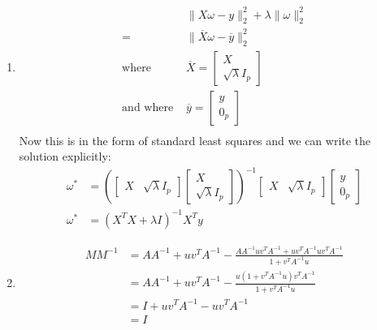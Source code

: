 \documentclass[11pt]{article}
\begin{document}
\begin{solution}
  \begin{enumerate}
    \item \begin{align*}
      &\|X \omega - y \|_2^2 + \lambda \|\omega\|_2^2 \\
      =& \|\overline{X} \omega - \overline{y}\|_2^2 \\
      \text{where } & \overline{X} = \begin{bmatrix} X \\ \sqrt{\lambda} I_p \end{bmatrix} \\
      \text{and where } & \overline{y} = \begin{bmatrix} y \\ 0_p \end{bmatrix} \\
    \end{align*}
    Now this is in the form of standard least squares and we can write the solution explicitly:
    \begin{align*}
      \omega^* &= (\begin{bmatrix} X & \sqrt{\lambda} I_p\end{bmatrix} \begin{bmatrix}X \\ \sqrt{\lambda} I_p \end{bmatrix})^{-1} \begin{bmatrix} X & \sqrt{\lambda} I_p \end{bmatrix} \begin{bmatrix} y \\ 0_p \end{bmatrix} \\
      \omega^* &= (X^T X + \lambda I)^{-1} X^T y
    \end{align*}

    \item \begin{align*}
        M M^{-1} &= A A^{-1} + u v^T A^{-1} - \frac{AA^{-1}uv^T A^{-1} + u v^T A^{-1} u v^T A^{-1}}{1 + v^T A^{-1} u} \\
        &= A A^{-1} + u v^T A^{-1} - \frac{u(1 + v^T A^{-1}u)v^T A^{-1}}{1 + v^T A^{-1} u} \\
        &= I + u v^T A^{-1} - u v^T A^{-1} \\
        &= I
    \end{align*}


\end{enumerate}
\end{solution}
\end{document}
